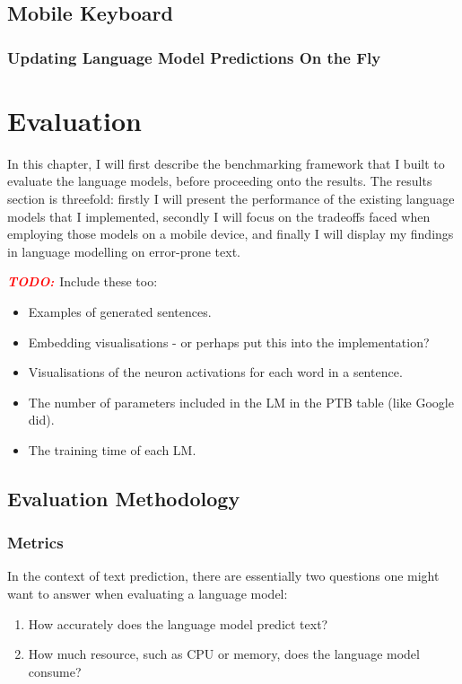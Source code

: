 \documentclass[a4paper, 12pt]{report}
\newcommand{\todo}{\textbf{\textit{\textcolor{red}{TODO: }}}}
\begin{document}
\section{Mobile Keyboard}
\subsection{Updating Language Model Predictions On the Fly}

\chapter{Evaluation}

In this chapter, I will first describe the benchmarking framework that I built to evaluate the language models, before proceeding onto the results. The results section is threefold: firstly I will present the performance of the existing language models that I implemented, secondly I will focus on the tradeoffs faced when employing those models on a mobile device, and finally I will display my findings in language modelling on error-prone text.

\todo{Include these too:}
\begin{itemize}
\item
	Examples of generated sentences.
\item
	Embedding visualisations - or perhaps put this into the implementation?
\item
	Visualisations of the neuron activations for each word in a sentence.
\item
	The number of parameters included in the LM in the PTB table (like Google did).
\item
	The training time of each LM.
\end{itemize}

\section{Evaluation Methodology}

\subsection{Metrics}

In the context of text prediction, there are essentially two questions one might want to answer when evaluating a language model:
\begin{enumerate}
\item
	How accurately does the language model predict text?
\item
	How much resource, such as CPU or memory, does the language model consume?
\end{enumerate}
\end{document}
